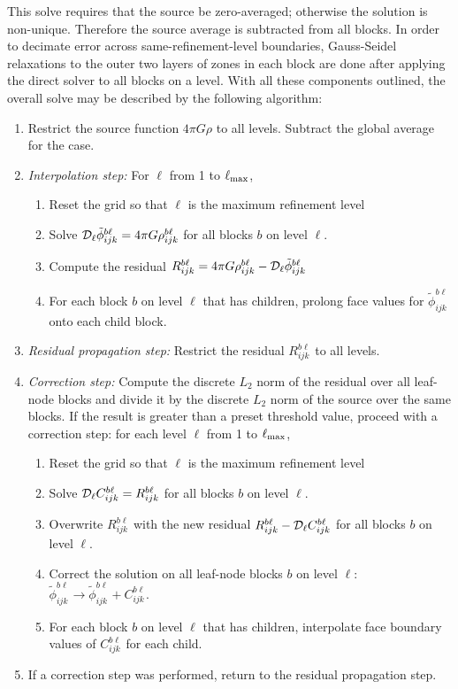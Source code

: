 This solve requires that the source be zero-averaged; otherwise the solution is
non-unique.  Therefore the source average is subtracted from all blocks.  In
order to decimate error across same-refinement-level boundaries, Gauss-Seidel
relaxations to the outer two layers of zones in each block are done after
applying the direct solver to all blocks on a level.  With all these components
outlined, the overall solve may be described by the following algorithm:

\begin{enumerate}
\item Restrict the source function $4\pi G\rho$ to all levels.  Subtract the
global average for the  case.
\item {\it Interpolation step:} For $\ell$ from 1 to $\ell_{\rm max}$,
      \begin{enumerate}
	\item Reset the grid so that $\ell$ is the maximum refinement level	
 	\item Solve ${\cal D}_\ell \tilde\phi^{b\ell}_{ijk} =
            4\pi G\rho^{b\ell}_{ijk}$ for all blocks $b$ on level $\ell$.
    	\item Compute the residual $R^{b\ell}_{ijk} = 4\pi G\rho^{b\ell}_{ijk} -
            {\cal D}_\ell \tilde\phi^{b\ell}_{ijk}$
    	\item For each block $b$ on level $\ell$ that has children, prolong
            face values for $\tilde\phi^{b\ell}_{ijk}$ onto each child block.
      \end{enumerate}
\item {\it Residual propagation step:} 
      Restrict the residual $R^{b\ell}_{ijk}$ to all levels.
\item {\it Correction step:} Compute the discrete $L_2$ norm of the residual over
      all leaf-node blocks and divide it by the discrete $L_2$ norm of the source
      over the same blocks. If the result is greater than a preset threshold
      value, proceed with a correction step: for each level $\ell$ from 1 to
      $\ell_{\rm max}$,
      \begin{enumerate}
	\item Reset the grid so that $\ell$ is the maximum refinement level
      	\item Solve ${\cal D}_\ell C^{b\ell}_{ijk} =
            R^{b\ell}_{ijk}$ for all blocks $b$ on level $\ell$.
      	\item Overwrite $R^{b\ell}_{ijk}$ with the new residual
            $R^{b\ell}_{ijk} - {\cal D}_\ell C^{b\ell}_{ijk}$ for all blocks
            $b$ on level $\ell$.
      \item Correct the solution on all leaf-node blocks $b$ on level $\ell$:
            $\tilde\phi^{b\ell}_{ijk} \rightarrow \tilde\phi^{b\ell}_{ijk} +
            C^{b\ell}_{ijk}$.
      \item For each block $b$ on level $\ell$ that has children, interpolate
            face boundary values of $C^{b\ell}_{ijk}$ for each child.
      \end{enumerate}
\item If a correction step was performed, return to the residual propagation
      step.
\end{enumerate}

